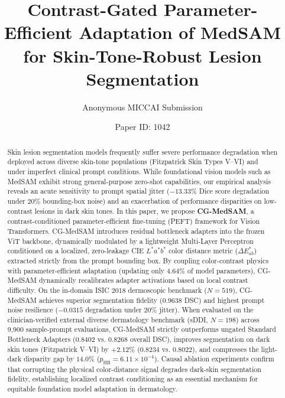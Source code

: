 \documentclass[runningheads]{llncs}
\begin{document}
\title{Contrast-Gated Parameter-Efficient Adaptation of MedSAM for Skin-Tone-Robust Lesion Segmentation}

\author{Anonymous MICCAI Submission \and Paper ID: 1042}

\maketitle

\begin{abstract}
Skin lesion segmentation models frequently suffer severe performance degradation when deployed across diverse skin-tone populations (Fitzpatrick Skin Types V--VI) and under imperfect clinical prompt conditions. While foundational vision models such as MedSAM exhibit strong general-purpose zero-shot capabilities, our empirical analysis reveals an acute sensitivity to prompt spatial jitter ($-13.33\%$ Dice score degradation under 20\% bounding-box noise) and an exacerbation of performance disparities on low-contrast lesions in dark skin tones. In this paper, we propose \textbf{CG-MedSAM}, a contrast-conditioned parameter-efficient fine-tuning (PEFT) framework for Vision Transformers. CG-MedSAM introduces residual bottleneck adapters into the frozen ViT backbone, dynamically modulated by a lightweight Multi-Layer Perceptron conditioned on a localized, zero-leakage CIE $L^*a^*b^*$ color distance metric ($\Delta E^*_{ab}$) extracted strictly from the prompt bounding box. By coupling color-contrast physics with parameter-efficient adaptation (updating only $4.64\%$ of model parameters), CG-MedSAM dynamically recalibrates adapter activations based on local contrast difficulty. On the in-domain ISIC 2018 dermoscopic benchmark ($N=519$), CG-MedSAM achieves superior segmentation fidelity ($0.9638$ DSC) and highest prompt noise resilience ($-0.0315$ degradation under 20\% jitter). When evaluated on the clinician-verified external diverse dermatology benchmark (sDDI, $N=198$) across 9,900 sample-prompt evaluations, CG-MedSAM strictly outperforms ungated Standard Bottleneck Adapters ($0.8402$ vs. $0.8268$ overall DSC), improves segmentation on dark skin tones (Fitzpatrick V--VI) by $+2.12\%$ ($0.8234$ vs. $0.8022$), and compresses the light-dark disparity gap by $14.0\%$ ($p_{\text{HB}} = 6.11 \times 10^{-4}$). Causal ablation experiments confirm that corrupting the physical color-distance signal degrades dark-skin segmentation fidelity, establishing localized contrast conditioning as an essential mechanism for equitable foundation model adaptation in dermatology.

\end{abstract}
\end{document}
